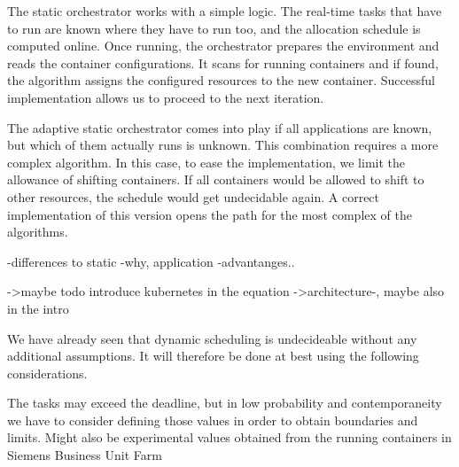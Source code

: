 \documentclass[]{scrartcl}
\begin{document}
The static orchestrator works with a simple logic. The real-time tasks that have to run are known where they have to run too, and the allocation schedule is computed online. 
Once running, the orchestrator prepares the environment and reads the container configurations.
It scans for running containers and if found, the algorithm assigns the configured resources to the new container.
Successful implementation allows us to proceed to the next iteration.

The adaptive static orchestrator comes into play if all applications are known, but which of them actually runs is unknown. 
This combination requires a more complex algorithm.
In this case, to ease the implementation, we limit the allowance of shifting containers.
If all containers would be allowed to shift to other resources, the schedule would get undecidable again.
A correct implementation of this version opens the path for the most complex of the algorithms.

-differences to static 
-why, application 
-advantanges.. 

->maybe todo introduce kubernetes in the equation 
->architecture-, maybe also in the intro


We have already seen that dynamic scheduling is undecideable without any additional assumptions. 
It will therefore be done at best using the following considerations.

The tasks may exceed the deadline, but in low probability and contemporaneity
we have to consider defining those values in order to obtain boundaries and limits. Might also be experimental values obtained from the running containers in Siemens Business Unit Farm





%
%
%
%
%
%
\end{document}
